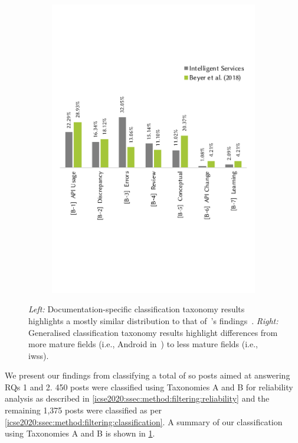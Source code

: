 \begin{figure}[t]
\begin{subfigure}[c]{0.49\linewidth}
    \includegraphics[width=\linewidth]{b-compare.pdf}
  \end{subfigure}
  \caption[Comparing documentation-specific and generalised classifications of Stack Overflow posts]{
    \textit{Left:} Documentation-specific classification taxonomy results highlights a mostly similar distribution to that of~\citeauthor{Aghajani:2019bo}'s findings~\citep{Aghajani:2019bo}.
    \textit{Right:} Generalised classification taxonomy results highlight differences from more mature fields (i.e., Android  in~\citet{Beyer:2018fm}) to less mature fields (i.e., \glspl{iws}).
  }  \label{icse2020:fig:ab-compare}
\end{figure}

We present our findings from classifying a total of \NumPostsCategorised{} \gls{so} posts aimed at answering RQs 1 and 2. 450 posts were classified using Taxonomies A and B for reliability analysis as described in \cref{icse2020:ssec:method:filtering:reliability} and the remaining 1,375 posts were classified as per \cref{icse2020:ssec:method:filtering:classification}. A summary of our classification using Taxonomies A and B is shown in \cref{icse2020:fig:ab-compare}.

